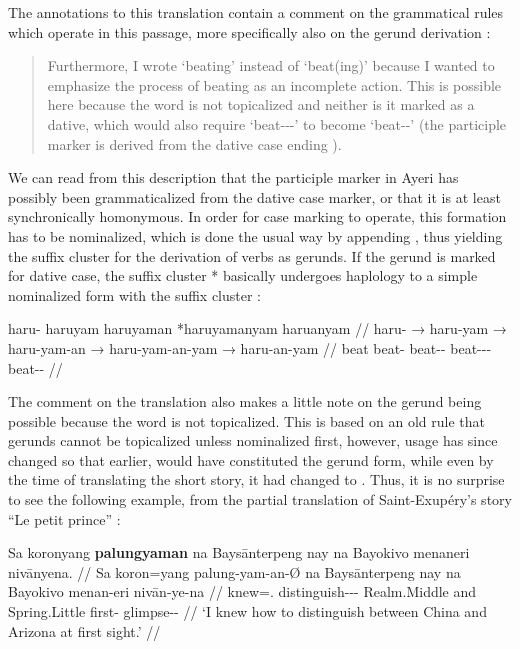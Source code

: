 The annotations to this translation contain a comment on the grammatical 
rules which operate in this passage, more specifically also on the gerund 
derivation :

\blockcquote[14--15]{becker:kafka:imperial}{Furthermore, I wrote
 `beating' instead of  `beat(ing)' because I wanted to
emphasize the process of beating as an incomplete action. This is possible here
because the word is not topicalized and neither is it marked as a dative, which
would also require  `beat-\Ptcp{}-\Nmlz{}-\Dat{}' to become
 `beat-\Nmlz{}-\Dat{}' (the participle marker  is 
derived from the dative case ending ).}

We can read from this description that the participle marker in Ayeri has
possibly been grammaticalized from the dative case marker, or that it is at
least synchronically homonymous. In order for case marking to operate, this
formation has to be nominalized, which is done the usual way by appending
, thus yielding the suffix cluster  for the
derivation of verbs as gerunds. If the gerund is marked for dative case, the
suffix cluster * basically undergoes haplology to a
simple nominalized form with the suffix cluster :

\ex\begingl
	\gla haru- {} haruyam {} haruyaman {} *haruyamanyam {} haruanyam //
	\glb haru- → haru-yam → haru-yam-an → haru-yam-an-yam → 
		haru-an-yam //
	\glc beat {} beat-\Ptcp{} {} beat-\Ptcp{}-\Nmlz{} {} 
		beat-\Ptcp{}-\Nmlz{}-\Dat{} {} beat-\Nmlz{}-\Dat{} //
\endgl\xe

The comment on the translation also makes a little note on the gerund being
possible because the word is not topicalized. This is based on an old rule that
gerunds cannot be topicalized unless nominalized first, however, usage has
since changed so that earlier,  would have constituted
the gerund form, while even by the time of translating the short story, it had
changed to . Thus, it is no surprise to see the
following example, from the partial translation of Saint-Exupéry's story
\enquote{Le petit prince} \citep[3, 13]{benung:petitprince}:

\ex\label{ex:exuperygerund}\begingl
	\gla Sa koronyang \textbf{palungyaman} na Baysānterpeng nay na Bayokivo 
		menaneri nivānyena. //
	\glb Sa koron=yang palung-yam-an-Ø na Baysānterpeng nay na 
		Bayokivo menan-eri nivān-ye-na //
	\glc \PatT{} knew=\Fsg{}.\Aarg{} 
		distinguish-\Ptcp{}-\Nmlz{}-\Top{} \Gen{} Realm.Middle 
		and \Gen{} Spring.Little first-\Ins{} glimpse-\Pl{}-\Gen{} //
	\glft `I knew how to distinguish between China and Arizona at first 
		sight.' //
\endgl\xe

